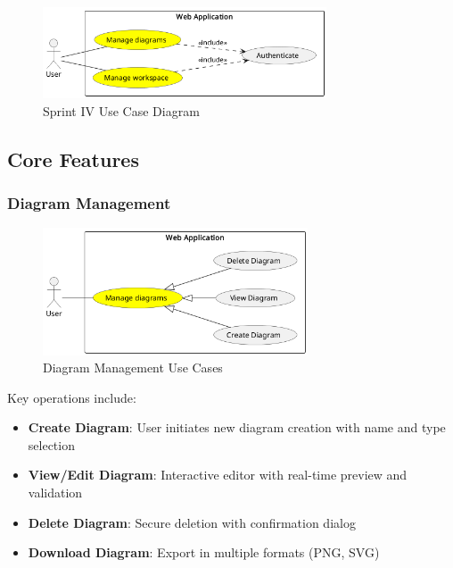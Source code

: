 \begin{figure}[H]
\centering
\includegraphics[width=0.75\textwidth]{conception/SprintIV/use_case_diagrams/use_case_diagram_of_SprintIV.png}
\caption{Sprint IV Use Case Diagram}
\end{figure}

\subsection{Core Features}

\subsubsection{Diagram Management}
\begin{figure}[H]
\centering
\includegraphics[width=0.7\textwidth]{conception/SprintIV/use_case_diagrams/refined_use_case_feature_diagram_management.png}
\caption{Diagram Management Use Cases}
\end{figure}

Key operations include:
\begin{itemize}
    \item \textbf{Create Diagram}: User initiates new diagram creation with name and type selection
    \item \textbf{View/Edit Diagram}: Interactive editor with real-time preview and validation
    \item \textbf{Delete Diagram}: Secure deletion with confirmation dialog
    \item \textbf{Download Diagram}: Export in multiple formats (PNG, SVG)
\end{itemize}

